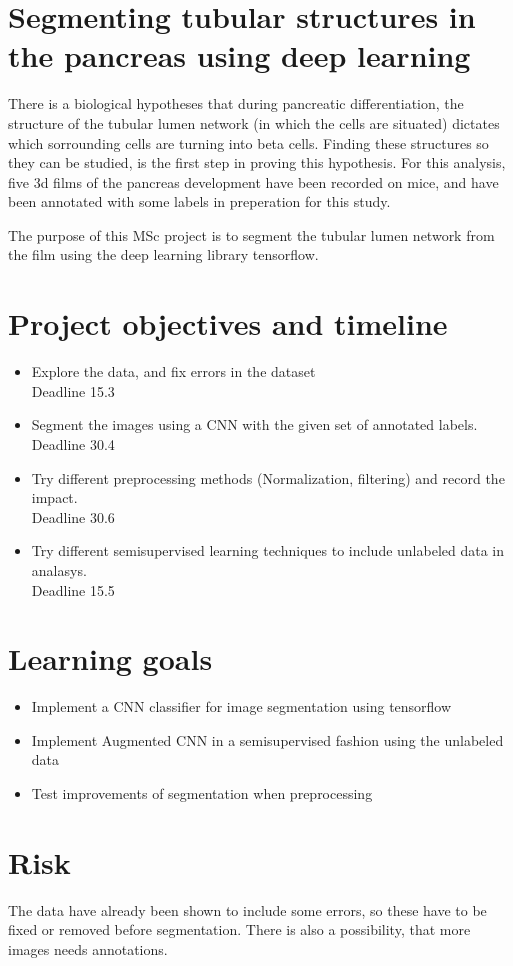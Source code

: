 
\section*{Segmenting tubular structures in the pancreas using deep learning} %
\label{sec:title}
There is a biological hypotheses that during pancreatic differentiation, the
structure of the tubular lumen network (in which the cells are situated)
dictates which sorrounding cells are turning into beta cells.
Finding these structures so they can be studied, is the first step in proving
this hypothesis.
For this analysis, five 3d films of the pancreas development have been recorded on
mice, and have been annotated with some labels in preperation for this study.

The purpose of this MSc project is to segment the tubular lumen network from
the film using the deep learning library tensorflow.

\section*{Project objectives and timeline} %
\label{sec:project_goal}
\begin{itemize}
    \item Explore the data, and fix errors in the dataset\\
    Deadline 15.3
    \item Segment the images using a CNN with the given set of annotated labels.\\
    Deadline 30.4
    \item Try different preprocessing methods (Normalization, filtering) and record the impact.\\
    Deadline 30.6
    \item Try different semisupervised learning techniques to include unlabeled
    data in analasys.\\
    Deadline 15.5
\end{itemize}

\section*{Learning goals}
\begin{itemize}
    \item Implement a CNN classifier for image segmentation using tensorflow
    \item Implement Augmented CNN in a semisupervised fashion using the unlabeled data
    \item Test improvements of segmentation when preprocessing
\end{itemize}

\section*{Risk} %
\label{sec:risk}
The data have already been shown to include some errors, so these have to be
fixed or removed before segmentation.
There is also a possibility, that more images needs annotations.
